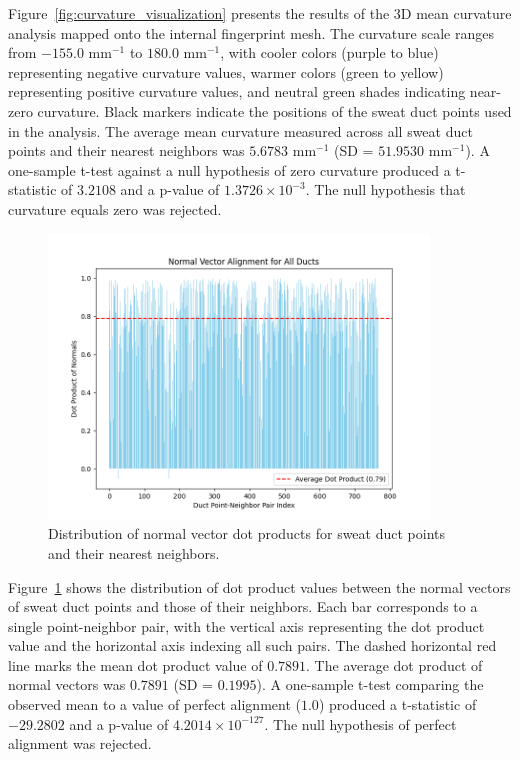 Figure~\ref{fig:curvature_visualization} presents the results of the 3D mean curvature analysis mapped onto the internal fingerprint mesh. The curvature scale ranges from $-155.0$ mm$^{-1}$ to $180.0$ mm$^{-1}$, with cooler colors (purple to blue) representing negative curvature values, warmer colors (green to yellow) representing positive curvature values, and neutral green shades indicating near-zero curvature. Black markers indicate the positions of the sweat duct points used in the analysis. The average mean curvature measured across all sweat duct points and their nearest neighbors was $5.6783$ mm$^{-1}$ (SD = $51.9530$ mm$^{-1}$). A one-sample t-test against a null hypothesis of zero curvature produced a t-statistic of $3.2108$ and a p-value of $1.3726 \times 10^{-3}$. The null hypothesis that curvature equals zero was rejected.
\begin{figure}[h!]
    \centering
    \includegraphics[width=0.9\textwidth]{images/normal_dot_product.png}
    \caption{Distribution of normal vector dot products for sweat duct points and their nearest neighbors.}
    \label{fig:normal_vector_dot_product}
\end{figure}

Figure~\ref{fig:normal_vector_dot_product} shows the distribution of dot product values between the normal vectors of sweat duct points and those of their neighbors. Each bar corresponds to a single point-neighbor pair, with the vertical axis representing the dot product value and the horizontal axis indexing all such pairs. The dashed horizontal red line marks the mean dot product value of $0.7891$. The average dot product of normal vectors was $0.7891$ (SD = $0.1995$). A one-sample t-test comparing the observed mean to a value of perfect alignment ($1.0$) produced a t-statistic of $-29.2802$ and a p-value of $4.2014 \times 10^{-127}$. The null hypothesis of perfect alignment was rejected.
